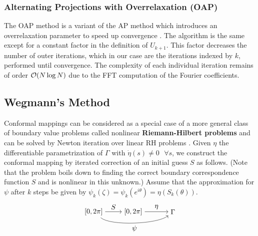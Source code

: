 \subsubsection{Alternating Projections with Overrelaxation (OAP)}
The OAP method is a variant of the AP method which introduces an overrelaxation parameter to speed up convergence \cite[§ 4]{Wegmann1989_alternating_projections}. The algorithm is the same except for a constant factor in the definition of $U_{k+1}$.
This factor decreases the number of outer iterations, which in our case are the iterations indexed by $k$, performed until convergence. The complexity of each individual iteration remains of order $\mathcal{O}(N \log N)$ due to the FFT computation of the Fourier coefficients.

\subsection{Wegmann's Method} \label{chap:WegmannMethod}
Conformal mappings can be considered as a special case of a more general class of boundary value problems called nonlinear \textbf{Riemann-Hilbert problems} and can be solved by Newton iteration over linear RH problems \cite[Chapter 2.5]{Wegmann2005_num_methods_confmapping}.
Given $\eta$ the differentiable parametrization of $\Gamma$ with $\dot\eta(s)\neq 0 \text{ } \forall s$, we construct the conformal mapping by iterated correction of an initial guess $S$ as follows.
(Note that the problem boils down to finding the correct boundary correspondence function $S$ and is nonlinear in this unknown.)
Assume that the approximation for $\psi$ after $k$ steps be given by $\psi_k(\zeta)=\psi_k(e^{i\theta})=\eta(S_k(\theta))$. 
$$
\begin{tikzpicture}[node distance=2cm, auto]
\node (A) {$[0,2\pi]$};
\node(B) [right of=A] {$[0,2\pi]$};
\node (C) [right of=B] {$\Gamma$};
\draw[->](A) to node {$S$}(B);
\draw[->](B) to node {$\eta$}(C);
\draw[->, out = -40, in = -140, looseness = 0.5] (A) to node [below]{$\psi$}(C); %
\end{tikzpicture}
$$ 
